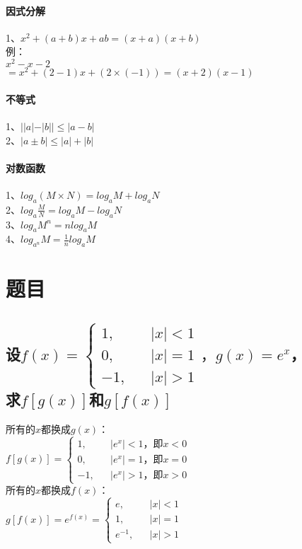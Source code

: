 \documentclass{article}
\begin{document}
\begin{flushleft}
\paragraph{因式分解}
1、$x^2+(a+b)x+ab=(x+a)(x+b)$\\
例：\\
\qquad $x^2-x-2$\\
\qquad $=x^2+(2-1)x+(2\times(-1))=(x+2)(x-1)$\\

\paragraph{不等式}
1、$||a|-|b||\le |a-b|$\\
2、$|a\pm b|\le |a|+|b|$\\

\paragraph{对数函数}
1、$log_a(M\times N)=log_aM+log_aN$\\
2、$log_a\frac{M}{N}=log_aM-log_aN$\\
3、$log_aM^n=nlog_aM$\\
4、$log_{a^n}M=\frac{1}{n}log_aM$\\



\section{题目}

\subsection{
设$f(x)=\left\{
\begin{array}{rcl}
1,& & |x|<1\\
0,& & |x|=1\\
-1,& & |x|>1
\end{array} \right.，g(x)=e^x$，\\
求$f[g(x)]$和$g[f(x)]$
}
所有的$x$都换成$g(x)$：\\
$f[g(x)]=\left\{
\begin{array}{rcl}
1,& & |e^x|<1，\mbox{即}x<0\\
0,& & |e^x|=1，\mbox{即}x=0\\
-1,& & |e^x|>1，\mbox{即}x>0
\end{array} \right.$\\
所有的$x$都换成$f(x)$：\\
$g[f(x)]=e^{f(x)}=\left\{
\begin{array}{rcl}
e,& & |x|<1\\
1,& & |x|=1\\
e^{-1},& & |x|>1
\end{array} \right.$\\


\end{flushleft}
\end{document}
